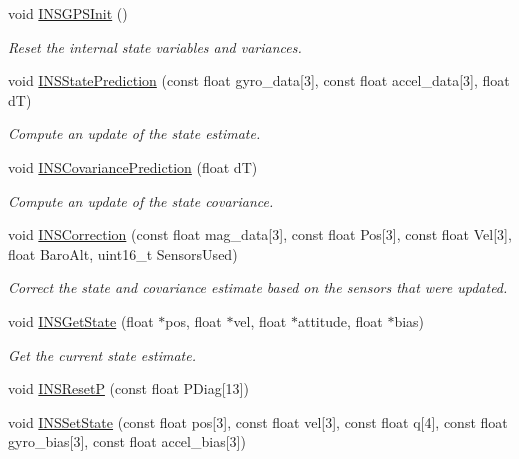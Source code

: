 \begin{DoxyCompactItemize}
\item 
void \hyperlink{group___tau_labs_libraries_ga37848fdaaf6ee155638ba5bb1521fffe}{\-I\-N\-S\-G\-P\-S\-Init} ()
\begin{DoxyCompactList}\small\item\em \-Reset the internal state variables and variances. \end{DoxyCompactList}\item 
void \hyperlink{group___tau_labs_libraries_ga57adeb4fc2f14e36f70531b52bd28193}{\-I\-N\-S\-State\-Prediction} (const float gyro\-\_\-data\mbox{[}3\mbox{]}, const float accel\-\_\-data\mbox{[}3\mbox{]}, float d\-T)
\begin{DoxyCompactList}\small\item\em \-Compute an update of the state estimate. \end{DoxyCompactList}\item 
void \hyperlink{group___tau_labs_libraries_gab680361c7bb4c9f7a0c06d189dc9d4a1}{\-I\-N\-S\-Covariance\-Prediction} (float d\-T)
\begin{DoxyCompactList}\small\item\em \-Compute an update of the state covariance. \end{DoxyCompactList}\item 
void \hyperlink{group___tau_labs_libraries_gaade300e6df3b427d5bde882fa2f7c93f}{\-I\-N\-S\-Correction} (const float mag\-\_\-data\mbox{[}3\mbox{]}, const float \-Pos\mbox{[}3\mbox{]}, const float \-Vel\mbox{[}3\mbox{]}, float \-Baro\-Alt, uint16\-\_\-t \-Sensors\-Used)
\begin{DoxyCompactList}\small\item\em \-Correct the state and covariance estimate based on the sensors that were updated. \end{DoxyCompactList}\item 
void \hyperlink{group___tau_labs_libraries_ga6713f5d490059531f10283aff19c8f04}{\-I\-N\-S\-Get\-State} (float $\ast$pos, float $\ast$vel, float $\ast$attitude, float $\ast$bias)
\begin{DoxyCompactList}\small\item\em \-Get the current state estimate. \end{DoxyCompactList}\item 
void \hyperlink{group___tau_labs_libraries_ga9afce3083f9ab90a40d620dde634f901}{\-I\-N\-S\-Reset\-P} (const float \-P\-Diag\mbox{[}13\mbox{]})
\item 
void \hyperlink{group___tau_labs_libraries_ga33be75afa533a464a8571e241a6caa10}{\-I\-N\-S\-Set\-State} (const float pos\mbox{[}3\mbox{]}, const float vel\mbox{[}3\mbox{]}, const float q\mbox{[}4\mbox{]}, const float gyro\-\_\-bias\mbox{[}3\mbox{]}, const float accel\-\_\-bias\mbox{[}3\mbox{]})

\end{DoxyCompactItemize}
